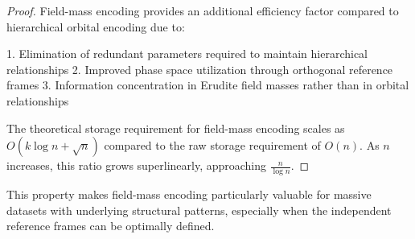 \begin{proof}
Field-mass encoding provides an additional efficiency factor compared to hierarchical orbital encoding due to:

1. Elimination of redundant parameters required to maintain hierarchical relationships
2. Improved phase space utilization through orthogonal reference frames
3. Information concentration in Erudite field masses rather than in orbital relationships

The theoretical storage requirement for field-mass encoding scales as $O(k \log n + \sqrt{n})$ compared to the raw storage requirement of $O(n)$. As $n$ increases, this ratio grows superlinearly, approaching $\frac{n}{\log n}$.
\end{proof}

This property makes field-mass encoding particularly valuable for massive datasets with underlying structural patterns, especially when the independent reference frames can be optimally defined.

